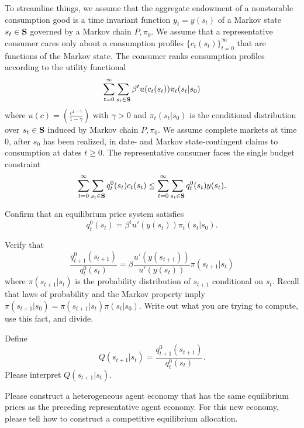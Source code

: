 \noindent 
To streamline things, we assume that the aggregate endowment of a nonstorable consumption good is a time invariant function $y_t = y(s_t)$
of a Markov state $s_t \in {\bf S}$ governed by a Markov chain $P, \pi_0$.  We assume that a representative
consumer cares only about a consumption profiles $\{c_t(s_t)\}_{t=0}^\infty$ that are functions of the Markov state.
The consumer ranks consumption profiles according to the utility functional
$$ \sum_{t=0}^\infty \sum_{s_t \in {\bf S}} \beta^t u(c_t(s_t)) \pi_t(s_t | s_0) $$
where $u(c) = \left({\frac{c^{1-\gamma}}{1 - \gamma}}\right)$ with $\gamma >0$ and $\pi_t(s_t|s_0)$ is the conditional distribution over $s_t \in {\bf S}$ induced by Markov chain  $P, \pi_0$.
We assume complete markets at time $0$, after $s_0$ has been realized, in date- and Markov state-contingent
claims to consumption at dates $t \geq 0$.  The representative consumer faces the single budget constraint
$$ \sum_{t=0}^\infty \sum_{s_t \in {\bf S}} q_t^0 (s_t) c_t(s_t) \leq  \sum_{t=0}^\infty \sum_{s_t \in {\bf S}}
q_t^0 (s_t) y(s_t)  .
$$

\medskip
{} Confirm that an equilibrium price system satisfies
$$ q_t^0(s_t) = \beta^t u'(y(s_t)) \pi_t(s_t | s_0) .$$

\medskip
{} Verify that
$$ {\frac{q^0_{t+1}(s_{t+1})}{q^0_t(s_t)}} = \beta {\frac{u'(y(s_{t+1}))}{u'(y(s_t))}} \pi(s_{t+1}| s_t) $$
where $\pi(s_{t+1}| s_t)$ is the probability distribution of $s_{t+1}$ conditional on $s_t$.
\medskip
{} Recall that laws of probability and the Markov property imply $\pi(s_{t+1} | s_0) = \pi(s_{t+1}| s_t) \pi(s_t | s_0)$. 
Write out what you are trying to compute, use this fact, and divide.

\medskip
{}  Define  
$$  Q(s_{t+1} | s_t) =  {\frac{q^0_{t+1}(s_{t+1})}{q^0_t(s_t)}}. $$
Please interpret $ Q(s_{t+1} | s_t)$.

\medskip
{} Please construct a heterogeneous agent economy that has the same equilibrium prices as
the preceding representative agent economy. For this new economy, please tell how to construct a competitive equilibrium allocation.





\eqnotracefalse
